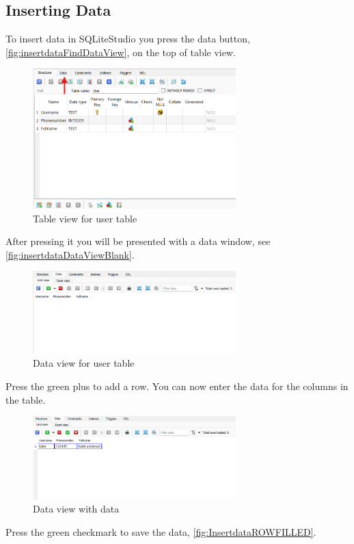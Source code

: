 \documentclass[a4paper,11pt,oneside]{article}
\begin{document}
\begin{sloppypar}
\subsection{Inserting Data}
\label{sqliteStudioInsertingData}
To insert data in SQLiteStudio you press the data button, \autoref{fig:insertdataFindDataView}, on the top of table view. 
\begin{figure}[!htb]
  \centering
  \includegraphics[width=0.7\textwidth]{sqlitestudio/insert_data/insert_data_find_view.png}
  \caption{Table view for user table}
  \label{fig:insertdataFindDataView}
\end{figure}
After pressing it you will be presented with a data window, see \autoref{fig:insertdataDataViewBlank}.
\begin{figure}[!htb]
  \centering
  \includegraphics[width=0.7\textwidth]{sqlitestudio/insert_data/insert_data_view_blank.png}
  \caption{Data view for user table}
  \label{fig:insertdataDataViewBlank}
\end{figure}
Press the green plus to add a row. You can now enter the data for the columns in the table.
\begin{figure}[!htb]
  \centering
  \includegraphics[width=0.7\textwidth]{sqlitestudio/insert_data/insert_data_row_populated.png}
  \caption{Data view with data}
  \label{fig:InsertdataROWFILLED}
\end{figure}
Press the green checkmark to save the data, \autoref{fig:InsertdataROWFILLED}. 
  

\end{sloppypar}
\end{document}
